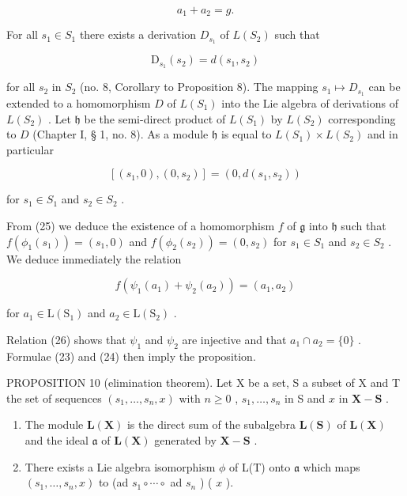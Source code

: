 \[
a _ {1} + a _ {2} = g.\tag{24}
\]

For all \(s_1 \in S_1\) there exists a derivation \(D_{s_1}\) of \(L(S_2)\) such that

\[
\mathrm{D} _ {s _ {1}} (s _ {2}) = d (s _ {1}, s _ {2})
\]

for all \(s_2\) in \(S_2\) (no. 8, Corollary to Proposition 8). The mapping \(s_1 \mapsto D_{s_1}\) can be extended to a homomorphism \(D\) of \(L(S_1)\) into the Lie algebra of derivations of \(L(S_2)\) . Let \(\mathfrak{h}\) be the semi-direct product of \(L(S_1)\) by \(L(S_2)\) corresponding to \(D\) (Chapter I, § 1, no. 8). As a module \(\mathfrak{h}\) is equal to \(L(S_1) \times L(S_2)\) and in particular

\[
[ (s _ {1}, 0), (0, s _ {2}) ] = (0, d (s _ {1}, s _ {2}))\tag{25}
\]

for \(s_{1} \in S_{1}\) and \(s_{2} \in S_{2}\) .

From (25) we deduce the existence of a homomorphism \(f\) of \(\mathfrak{g}\) into \(\mathfrak{h}\) such that \(f(\phi_1(s_1)) = (s_1, 0)\) and \(f(\phi_2(s_2)) = (0, s_2)\) for \(s_1 \in S_1\) and \(s_2 \in S_2\) . We deduce immediately the relation

\[
f (\psi_ {1} (a _ {1}) + \psi_ {2} (a _ {2})) = (a _ {1}, a _ {2})\tag{26}
\]

for \(a_1 \in \mathrm{L}(\mathrm{S}_1)\) and \(a_2 \in \mathrm{L}(\mathrm{S}_2)\) .

Relation (26) shows that \(\psi_{1}\) and \(\psi_{2}\) are injective and that \(a_{1} \cap a_{2} = \{0\}\) . Formulae (23) and (24) then imply the proposition.

PROPOSITION 10 (elimination theorem). Let X be a set, S a subset of X and T the set of sequences \((s_1, \ldots, s_n, x)\) with \(n \geqslant 0\) , \(s_1, \ldots, s_n\) in S and \(x\) in \(\mathbf{X} - \mathbf{S}\) .

\begin{enumerate}
\def\labelenumi{(\alph{enumi})}
\item
  The module \(\mathbf{L}(\mathbf{X})\) is the direct sum of the subalgebra \(\mathbf{L}(\mathbf{S})\) of \(\mathbf{L}(\mathbf{X})\) and the ideal \(\mathfrak{a}\) of \(\mathbf{L}(\mathbf{X})\) generated by \(\mathbf{X} - \mathbf{S}\) .
\item
  There exists a Lie algebra isomorphism \(\phi\) of L(T) onto \(\mathfrak{a}\) which maps \((s_1, \ldots, s_n, x)\) to (ad \(s_1 \circ \cdots \circ\) ad \(s_n\) ) ( \(x\) ).
\end{enumerate}

